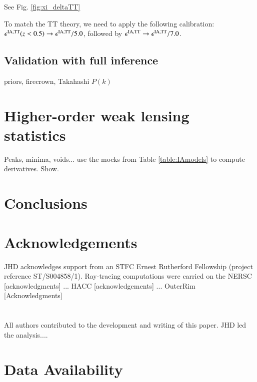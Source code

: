 \documentclass[useAMS,usenatbib]{mn2e}
\begin{document}
See Fig. \ref{fig:xi_deltaTT}

To match the TT theory, we need to apply the following calibration: $\epsilon^{\rm IA, TT}(z<0.5) \rightarrow \epsilon^{\rm IA, TT} /5.0$, followed by $\epsilon^{\rm IA, TT} \rightarrow \epsilon^{\rm IA, TT}/7.0$.



\subsection{Validation with full inference}
 \label{sec:inference}

priors, firecrown, Takahashi $P(k)$


\section{Higher-order weak lensing statistics}
\label{sec:HOWLS}

Peaks, minima, voids... use the mocks from Table \ref{table:IAmodels} to compute derivatives. Show.


\section{Conclusions}
\label{sec:conclusion}

\section*{Acknowledgements}

JHD acknowledges support from an STFC Ernest Rutherford Fellowship (project reference ST/S004858/1). Ray-tracing computations were carried on the NERSC [acknowledgments] ... HACC [acknowledgements] ... OuterRim [Acknowledgments]
\\
\\
\\
{\footnotesize All authors contributed to the development and writing of this paper. JHD led the analysis.... }




\section*{Data Availability}

 
\end{document}
